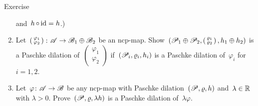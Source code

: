 \documentclass[b]{subfiles}
\begin{document}
\begin{parsec}
\begin{point}{Exercise}
\begin{enumerate}
and~$h \mathop{\circ} \operatorname{id} = h$.)
\item
    Let~$ \left(\begin{smallmatrix} \varphi_1 \\ \varphi_2
    \end{smallmatrix}\right) \colon \mathscr{A} \to \mathscr{B}_1 \oplus \mathscr{B}_2$
    be an ncp-map.
Show~$(\mathscr{P}_1 \oplus \mathscr{P}_2,
        \left(\begin{smallmatrix} \varrho_1 \\ \varrho_2 \end{smallmatrix}\right),
        h_1 \oplus h_2)$
        is a Paschke dilation of~$\left(\begin{smallmatrix} \varphi_1 \\ \varphi_2 
        \end{smallmatrix}\right)$
    if~$(\mathscr{P}_i, \varrho_i, h_i)$
    is a Paschke dilation of~$\varphi_i$ for~$i=1,2$.
\item
Let~$\varphi\colon \mathscr{A} \to \mathscr{B}$
    be any ncp-map with Paschke dilation~$(\mathscr{P}, \varrho, h)$
    and~$\lambda \in \mathbb{R}$ with $\lambda > 0$.
Prove~$(\mathscr{P}, \varrho, \lambda h)$
    is a Paschke dilation of~$\lambda \varphi$.
\end{enumerate}
\end{point}
\end{parsec}
\end{document}
